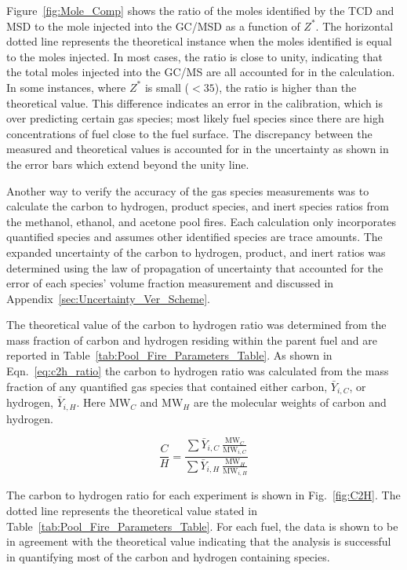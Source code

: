\documentclass[12pt]{article}
\begin{document}
Figure~\ref{fig:Mole_Comp} shows the ratio of the moles identified by the TCD and MSD to the mole injected into the GC/MSD as a function of $Z^{*}$. The horizontal dotted line represents the theoretical instance when the moles identified is equal to the moles injected. In most cases, the ratio is close to unity, indicating that the total moles injected into the GC/MS are all accounted for in the calculation. In some instances, where $Z^{*}$ is small ($<35$), the ratio is higher than the theoretical value. This difference indicates an error in the calibration, which is over predicting certain gas species; most likely fuel species since there are high concentrations of fuel close to the fuel surface. The discrepancy between the measured and theoretical values is accounted for in the uncertainty as shown in the error bars which extend beyond the unity line.

Another way to verify the accuracy of the gas species measurements was to calculate the carbon to hydrogen, product species, and inert species ratios from the methanol, ethanol, and acetone pool fires. Each calculation only incorporates quantified species and assumes other identified species are trace amounts. The expanded uncertainty of the carbon to hydrogen, product, and inert ratios was determined using the law of propagation of uncertainty that accounted for the error of each species' volume fraction measurement and discussed in Appendix~\ref{sec:Uncertainty_Ver_Scheme}.

The theoretical value of the carbon to hydrogen ratio was determined from the mass fraction of carbon and hydrogen residing within the parent fuel and are reported in Table~\ref{tab:Pool_Fire_Parameters_Table}. As shown in Eqn.~\ref{eq:c2h_ratio} the carbon to hydrogen ratio was calculated from the mass fraction of any quantified gas species that contained either carbon, $\bar{Y}_{i,C}$, or hydrogen, $\bar{Y}_{i,H}$. Here $\textrm{MW}_{C}$ and $\textrm{MW}_{H}$ are the molecular weights of carbon and hydrogen.

\begin{equation}\label{eq:c2h_ratio}
 \frac{C}{H}=\frac{\sum{\bar{Y}_{i,C}~{\frac{\textrm{MW}_{C}}{\textrm{MW}_{i,C}}}}}{\sum{\bar{Y}_{i,H}~{\frac{\textrm{MW}_{H}}{\textrm{MW}_{i,H}}}}}
\end{equation}

The carbon to hydrogen ratio for each experiment is shown in Fig.~\ref{fig:C2H}. The dotted line represents the theoretical value stated in Table~\ref{tab:Pool_Fire_Parameters_Table}. For each fuel, the data is shown to be in agreement with the theoretical value indicating that the analysis is successful in quantifying most of the carbon and hydrogen containing species.
\end{document}
